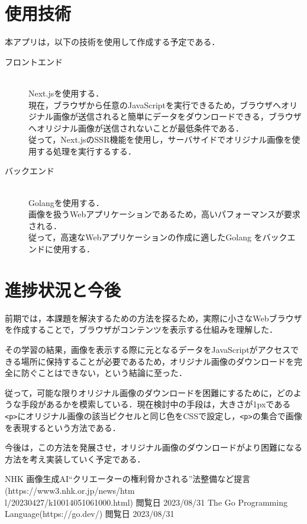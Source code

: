 ﻿\documentclass[twocolumn,a4j]{jarticle}
\begin{document}
\section{使用技術}
本アプリは，以下の技術を使用して作成する予定である．
\begin{description}
  \item[フロントエンド]\mbox{}\\
  Next.jsを使用する．\\
  現在，ブラウザから任意のJavaScriptを実行できるため，ブラウザへオリジナル画像が送信されると簡単にデータをダウンロードできる，ブラウザへオリジナル画像が送信されないことが最低条件である．\\
  従って，Next.jsのSSR機能を使用し，サーバサイドでオリジナル画像を使用する処理を実行するする．
  \item[バックエンド]\mbox{}\\
  Golangを使用する．\\
  画像を扱うWebアプリケーションであるため，高いパフォーマンスが要求される．\\
  従って，高速なWebアプリケーションの作成に適したGolang\cite{go} をバックエンドに使用する．
\end{description}


\section{進捗状況と今後}
前期では，本課題を解決するための方法を探るため，実際に小さなWebブラウザを作成することで，ブラウザがコンテンツを表示する仕組みを理解した．\par
その学習の結果，画像を表示する際に元となるデータをJavaScriptがアクセスできる場所に保持することが必要であるため，オリジナル画像のダウンロードを完全に防ぐことはできない，という結論に至った．\par
従って，可能な限りオリジナル画像のダウンロードを困難にするために，どのような手段があるかを模索している．現在検討中の手段は，大きさが1pxである\lstinline!<p>!にオリジナル画像の該当ピクセルと同じ色をCSSで設定し，\lstinline|<p>|の集合で画像を表現するという方法である．\par
今後は，この方法を発展させ，オリジナル画像のダウンロードがより困難になる方法を考え実装していく予定である．


\begin{thebibliography}{9}\setlength{\itemsep}{-2pt}
   NHK 画像生成AI“クリエーターの権利脅かされる”法整備など提言(https://www3.nhk.or.jp/news/htm\\l/20230427/k10014051061000.html) 閲覧日 2023/08/31
   The Go Programming Language(https://go.dev/) 閲覧日 2023/08/31
\end{thebibliography}
\end{document}
